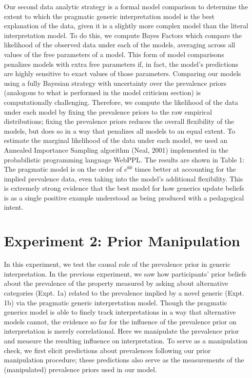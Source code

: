 \documentclass[floatsintext,doc]{apa6}
\begin{document}
Our second data analytic strategy is a formal model comparison to determine the extent to which the pragmatic generic interpretation model is the best explanation of the data, given it is a slightly more complex model than the literal interpretation model.
To do this, we compute Bayes Factors which compare the likelihood of the observed data under each of the models, averaging across all values of the free parameters of a model.
This form of model comparisons penalizes models with extra free parameters if, in fact, the model's predictions are highly sensitive to exact values of those parameters.
Comparing our models using a fully Bayesian strategy with uncertainty over the prevalence priors (analogous to what is performed in the model criticism section) is computationally challenging.
Therefore, we compute the likelihood of the data under each model by fixing the prevalence priors to the raw empirical distributions; fixing the prevalence priors reduces the overall flexibility of the models, but does so in a way that penalizes all models to an equal extent.
To estimate the marginal likelihood of the data under each model, we used an Annealed Importance Sampling algorithm (Neal, 2001) implemented in the probabilistic programming language WebPPL.
The results are shown in Table 1: The pragmatic model is on the order of \(e^{60}\) times better at accounting for the implied prevalence data, even taking into the model's additional flexibility.
This is extremely strong evidence that the best model for how generics update beliefs is as a single positive example understood as being produced with a pedagogical intent.



\hypertarget{experiment-2-prior-manipulation}{%
\section{Experiment 2: Prior Manipulation}\label{experiment-2-prior-manipulation}}

In this experiment, we test the causal role of the prevalence prior in generic interpretation.
In the previous experiment, we saw how participants' prior beliefs about the prevalence of the property measured by asking about alternative categories (Expt. 1a) related to the prevalence implied by a novel generic (Expt. 1b) via the pragmatic generic interpretation model.
Though the pragmatic generics model is able to finely track interpretations in a way that alternative models cannot, the evidence so far for the influence of the prevalence prior on interpretation is merely correlational.
Here we manipulate the prevalence prior and measure the resulting influence on interpretation.
To serve as a manipulation check, we first elicit predictions about prevalences following our prior manipulation procedure; these predictions also serve as the measurements of the (manipulated) prevalence priors used in our model.
\end{document}
